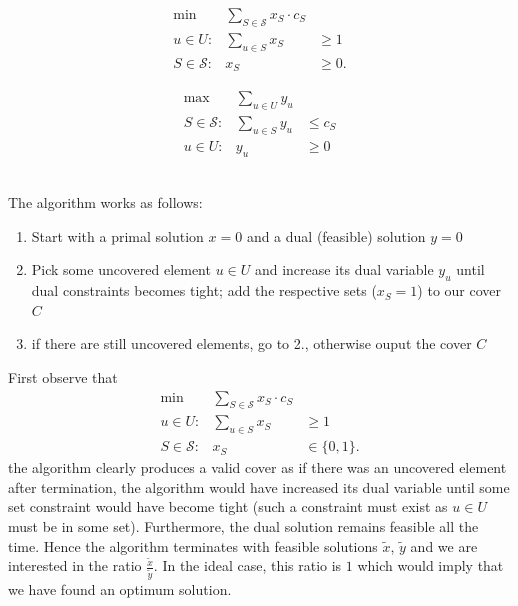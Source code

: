\documentclass{article}
\begin{document}
\begin{minipage}{0.5\textwidth}
\begin{eqnarray}
\mbox{min} & \displaystyle \sum_{S\in \mathcal{S}} x_S \cdot c_S \nonumber \\
 u\in U: & \displaystyle \sum_{u\in S} x_S  & \geq 1 \nonumber\\
 S \in \mathcal{S}: & x_S  & \geq 0. \nonumber
\end{eqnarray}
\end{minipage}
\begin{minipage}{0.5\textwidth}
\begin{eqnarray}
\mbox{max} & \displaystyle \sum_{u\in U} y_u \nonumber \\
 S\in \mathcal{S}: & \displaystyle \sum_{u\in S} y_u  & \leq c_S \nonumber\\
 u\in U: & y_u  & \geq 0\nonumber
\end{eqnarray}
\end{minipage}
\\[.5cm]

The algorithm works as follows:
\begin{enumerate}
\item Start with a primal solution $x=0$ and a dual (feasible) solution $y=0$
\item Pick some uncovered element $u\in U$ and increase its dual variable $y_u$ until dual
		constraints becomes tight; add the respective sets ($x_S=1$) to our cover $C$
\item if there are still uncovered elements, go to 2., otherwise ouput the cover $C$
\end{enumerate}

First observe that\begin{eqnarray}\label{SCILP}
\mbox{min} & \displaystyle \sum_{S\in \mathcal{S}} x_S \cdot c_S\\
 u\in U: & \displaystyle \sum_{u\in S} x_S  & \geq 1 \nonumber\\
 S \in \mathcal{S}: & x_S  & \in \{0,1\}. \nonumber
\end{eqnarray} the algorithm clearly produces a valid cover as if there was an uncovered element after termination, the algorithm would have increased its dual variable until some set constraint would have become tight (such a constraint must exist as $u\in U$ must be in some set). Furthermore, the dual solution remains feasible all the time. Hence the algorithm terminates with feasible solutions $\widetilde{x}$, $\widetilde{y}$ and we are interested in the ratio $\frac{\widetilde{x}}{\widetilde{y}}$. In the ideal case, this ratio is $1$ which would imply that we have found an optimum solution.
\end{document}
